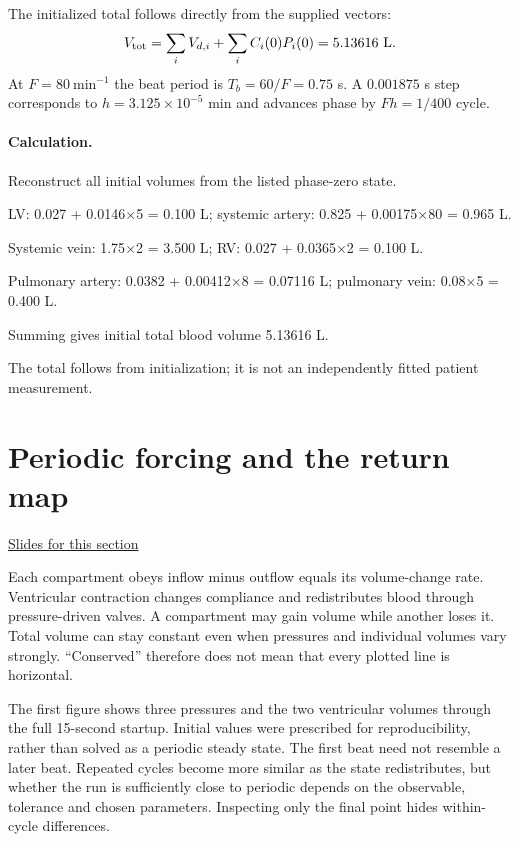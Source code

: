 \documentclass[11pt,letterpaper]{article}
\theoremstyle{definition}\newtheorem{definition}{Definition}\newtheorem{example}{Example}
\numberwithin{equation}{section}
\begin{document}
The initialized total follows directly from the supplied vectors:
\[
 V_{\rm tot}=\sum_i V_{d,i}+\sum_i C_i(0)P_i(0)=5.13616\ \mathrm L.
\]
At $F=80\ \mathrm{min}^{-1}$ the beat period is $T_b=60/F=0.75$ s. A $0.001875$ s step corresponds to $h=3.125\times10^{-5}$ min and advances phase by $Fh=1/400$ cycle.

\paragraph{Calculation.} Reconstruct all initial volumes from the listed phase-zero state.

LV: 0.027 + 0.0146\ensuremath{\times}5 = 0.100 L; systemic artery: 0.825 + 0.00175\ensuremath{\times}80 = 0.965 L.

Systemic vein: 1.75\ensuremath{\times}2 = 3.500 L; RV: 0.027 + 0.0365\ensuremath{\times}2 = 0.100 L.

Pulmonary artery: 0.0382 + 0.00412\ensuremath{\times}8 = 0.07116 L; pulmonary vein: 0.08\ensuremath{\times}5 = 0.400 L.

Summing gives initial total blood volume 5.13616 L.

The total follows from initialization; it is not an independently fitted patient measurement.
\section{Periodic forcing and the return map}
\hypertarget{note-periodic-forcing-and-the-return-map}{}\label{note:periodic-forcing-and-the-return-map}
{\small \href{slides.html\#frame=a-periodically-forced-state-panel-1\&step=1}{Slides for this section}}\par
Each compartment obeys inflow minus outflow equals its volume-change rate. Ventricular contraction changes compliance and redistributes blood through pressure-driven valves. A compartment may gain volume while another loses it. Total volume can stay constant even when pressures and individual volumes vary strongly. ``Conserved'' therefore does not mean that every plotted line is horizontal.

The first figure shows three pressures and the two ventricular volumes through the full 15-second startup. Initial values were prescribed for reproducibility, rather than solved as a periodic steady state. The first beat need not resemble a later beat. Repeated cycles become more similar as the state redistributes, but whether the run is sufficiently close to periodic depends on the observable, tolerance and chosen parameters. Inspecting only the final point hides within-cycle differences.
\end{document}
